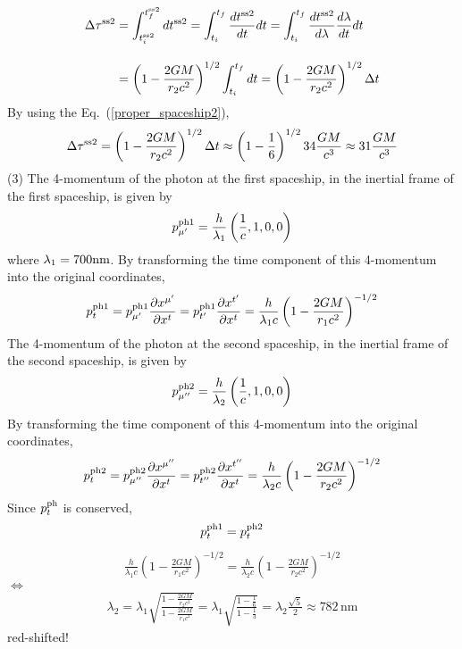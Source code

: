 \documentclass[12pt]{article}
\begin{document}
\begin{align}
\Delta \tau^{\rm{ss}2} &= \int_{t^{\rm{ss}2}_{i}}^{t^{\rm{ss}2}_{f}} d t^{\rm{ss}2} = \int_{t_{i}}^{t_{f}} \frac{d t^{\rm{ss}2}}{d t} d t 
= \int_{t_{i}}^{t_{f}} \frac{d t^{\rm{ss}2}}{d \lambda} \frac{d \lambda}{d t} d t \nonumber\\[1em]
&= \left(1 - \frac{2 G M}{r_2 c^2} \right)^{1/2} \int_{t_{i}}^{t_{f}}  d t = \left(1 - \frac{2 G M}{r_2 c^2} \right)^{1/2} \Delta t
\label{proper_spaceship2}
\end{align}
By using the Eq.~(\ref{proper_spaceship2}),
\begin{align*}
\Delta \tau^{\rm{ss}2} = \left(1 - \frac{2 G M}{r_2 c^2} \right)^{1/2} \Delta t \approx \left(1 - \frac{1}{6} \right)^{1/2} 34 \frac{G M}{c^3} \approx 31 \frac{G M}{c^3}
\end{align*}
(3)
The 4-momentum of the photon at the first spaceship, in the inertial frame of the first spaceship, is given by
\begin{align}
p_{\mu'}^{\rm ph1} = \frac{h}{\lambda_1}\left(\frac{1}{c}, 1, 0, 0\right)
\end{align}
where $\lambda_1 = 700 \rm{nm}$. By transforming the time component of this 4-momentum into the original coordinates,
\begin{align}
p_{t}^{\rm ph1} = p_{\mu'}^{\rm ph1} \frac{\partial x^{\mu'}}{\partial x^{t}} = p_{t'}^{\rm ph1} \frac{\partial x^{t'}}{\partial x^{t}} = \frac{h}{\lambda_1 c} \left(1 - \frac{2 G M}{r_1 c^2} \right)^{- 1/2}
\end{align}
The 4-momentum of the photon at the second spaceship, in the inertial frame of the second spaceship, is given by
\begin{align}
p_{\mu''}^{\rm ph2} = \frac{h}{\lambda_2}\left(\frac{1}{c}, 1, 0, 0\right)
\end{align}
By transforming the time component of this 4-momentum into the original coordinates,
\begin{align}
p_{t}^{\rm ph2} = p_{\mu''}^{\rm ph2} \frac{\partial x^{\mu''}}{\partial x^{t}} = p_{t''}^{\rm ph2} \frac{\partial x^{t''}}{\partial x^{t}} = \frac{h}{\lambda_2 c} \left(1 - \frac{2 G M}{r_2 c^2} \right)^{- 1/2}
\end{align}
Since $p_t^{\rm ph}$ is conserved,
\begin{align}
p_{t}^{\rm ph1} = p_{t}^{\rm ph2}
\end{align}
\begin{align}
\frac{h}{\lambda_1 c} \left(1 - \frac{2 G M}{r_1 c^2} \right)^{- 1/2} = \frac{h}{\lambda_2 c} \left(1 - \frac{2 G M}{r_2 c^2} \right)^{- 1/2}
\end{align}
$\Leftrightarrow$
\begin{align}
\lambda_2 = \lambda_1 \sqrt{\frac{1 - \frac{2 G M}{r_2 c^2}}{1 - \frac{2 G M}{r_1 c^2}}} = \lambda_1 \sqrt{\frac{1 - \frac{1}{6}}{1 - \frac{1}{3}}} = \lambda_2 \frac{\sqrt{5}}{2} \approx 782 \,\mathrm{nm}
\end{align}
{\color{red} red-shifted!}
\end{document}
